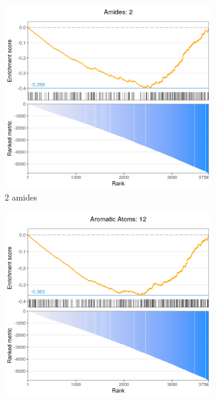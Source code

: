 \begin{figure}[!h]
	\centering
	\begin{subfigure}[h]{0.32\textwidth}
		\includegraphics[width=\textwidth]{images/ctrap/molecular-descriptors-a}
		\caption{\footnotesize{2 amides}}
	\end{subfigure}
	\begin{subfigure}[h]{0.32\textwidth}
		\includegraphics[width=\textwidth]{images/ctrap/molecular-descriptors-b}

\end{subfigure}
\end{figure}
